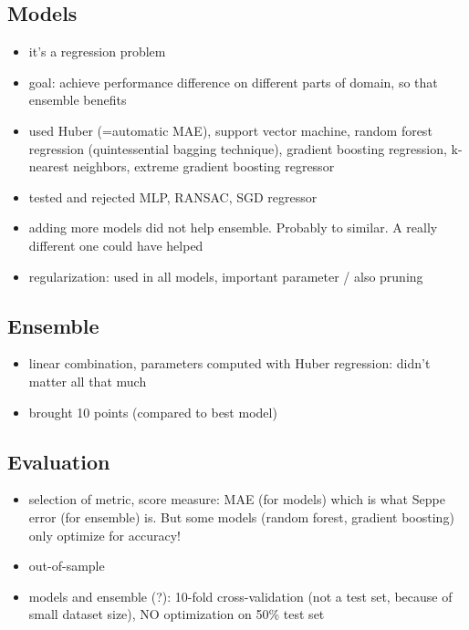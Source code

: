 \documentclass[a4paper,11pt]{article}
\begin{document}
\subsection{Models}
\begin{itemize}
\item it's a regression problem
\item goal: achieve performance difference on different parts of domain, so that ensemble benefits
\item used Huber (=automatic MAE), support vector machine, random forest regression (quintessential bagging technique), gradient boosting regression, k-nearest neighbors, extreme gradient boosting regressor
\item tested and rejected MLP,  RANSAC, SGD regressor
\item adding more models did not help ensemble. Probably to similar. A really different one could have helped
\item regularization: used in all models, important parameter / also pruning
\end{itemize}

\subsection{Ensemble}
\begin{itemize}
\item linear combination, parameters computed with Huber regression: didn't matter all that much
\item brought 10 points (compared to best model)
\end{itemize}

\subsection{Evaluation}
\begin{itemize}
\item selection of metric, score measure: MAE  (for models) which is what Seppe error (for ensemble) is. But some models (random forest, gradient boosting) only optimize for accuracy!
\item out-of-sample
\item models and ensemble (?): 10-fold cross-validation (not a test set, because of small dataset size), NO optimization on 50\% test set 
\end{itemize}
\end{document}

